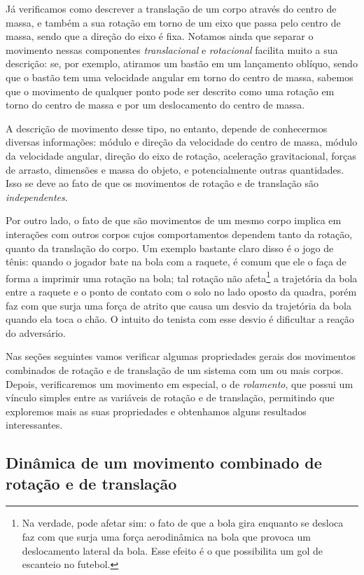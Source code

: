 Já verificamos como descrever a translação de um corpo através do centro de massa, e também a sua  rotação em torno de um eixo que passa pelo centro de massa, sendo que a direção do eixo é fixa. Notamos ainda que separar o movimento nessas componentes \emph{translacional} e \emph{rotacional} facilita muito a sua descrição: se, por exemplo, atiramos um bastão em um lançamento oblíquo, sendo que o bastão tem uma velocidade angular em torno do centro de massa, sabemos que o movimento de qualquer ponto pode ser descrito como uma rotação em torno do centro de massa e por um deslocamento do centro de massa.

A descrição de movimento desse tipo, no entanto, depende de conhecermos diversas informações: módulo e direção da velocidade do centro de massa, módulo da velocidade angular, direção do eixo de rotação, aceleração gravitacional, forças de arrasto, dimensões e massa do objeto, e potencialmente outras quantidades. Isso se deve ao fato de que os movimentos de rotação e de translação são \emph{independentes}.

Por outro lado, o fato de que são movimentos de um mesmo corpo implica em interações com outros corpos cujos comportamentos dependem tanto da rotação, quanto da translação do corpo. Um exemplo bastante claro disso é o jogo de tênis: quando o jogador bate na bola com a raquete, é comum que ele o faça de forma a imprimir uma rotação na bola; tal rotação não afeta\footnote{Na verdade, pode afetar sim: o fato de que a bola gira enquanto se desloca faz com que surja uma força aerodinâmica na bola que provoca um deslocamento lateral da bola. Esse efeito é o que possibilita um gol de escanteio no futebol.} a trajetória da bola entre a raquete e o ponto de contato com o solo no lado oposto da quadra, porém faz com que surja uma força de atrito que causa um desvio da trajetória da bola quando ela toca o chão. O intuito do tenista com esse desvio é dificultar a reação do adversário.

Nas seções seguintes vamos verificar algumas propriedades gerais dos movimentos combinados de rotação e de translação de um sistema com um ou mais corpos. Depois, verificaremos um movimento em especial, o de \emph{rolamento}, que possui um vínculo simples entre as variáveis de rotação e de translação, permitindo que exploremos mais as suas propriedades e obtenhamos alguns resultados interessantes.

\subsection{Dinâmica de um movimento combinado de rotação e de translação}

